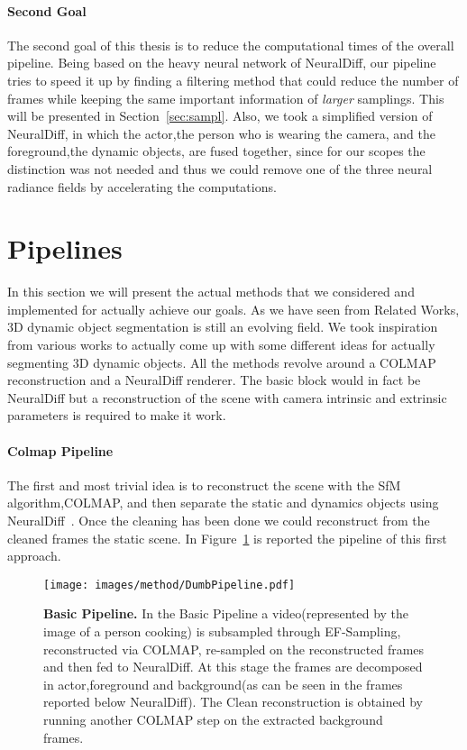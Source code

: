 \paragraph{Second Goal}The second goal of this thesis is to reduce the computational times of the 
overall pipeline. Being based on the heavy neural network of NeuralDiff, our pipeline
tries to speed it up by finding a filtering method that could reduce the 
number of frames while keeping the same important information of \textit{larger}
samplings. This will be presented in Section~\ref{sec:sampl}. Also, we took a 
simplified version of NeuralDiff, in which the actor,the person who is 
wearing the camera, and the foreground,the dynamic objects, are fused together,
since for our scopes the distinction was not needed and thus we could remove 
one of the three neural radiance fields by accelerating the computations.


\section{Pipelines}
In this section we will present the actual methods that we considered and implemented 
for actually achieve our goals. As we have seen from Related Works, 3D dynamic object 
segmentation is still an evolving field. We took inspiration from various works
to actually come up with some different ideas for actually segmenting 3D dynamic objects.
All the methods revolve around a COLMAP reconstruction and a NeuralDiff renderer. The 
basic block would in fact be NeuralDiff but a reconstruction of the scene with camera intrinsic and 
extrinsic parameters is required to make it work.

\paragraph{Colmap Pipeline}
The first and most trivial idea is to reconstruct the scene with the SfM algorithm,COLMAP,
and then separate the static and dynamics objects using NeuralDiff~\cite{neuraldiff}. Once 
the cleaning has been done we could reconstruct from the cleaned frames the static scene. 
In Figure~\ref{fig:dumb} is reported the pipeline of this first approach.
\begin{figure}[t]
    \centering
    \texttt{[image: images/method/DumbPipeline.pdf]} 
    \caption{\textbf{Basic Pipeline.} In the Basic Pipeline a video(represented by the image of a person cooking)
    is subsampled through EF-Sampling, reconstructed 
    via COLMAP, re-sampled on the reconstructed frames and then fed to NeuralDiff. At this stage the frames are
    decomposed in actor,foreground and background(as can be seen in the frames reported below NeuralDiff).
    The Clean reconstruction is obtained by running
    another COLMAP step on the extracted background frames.}\label{fig:dumb}
\end{figure}

